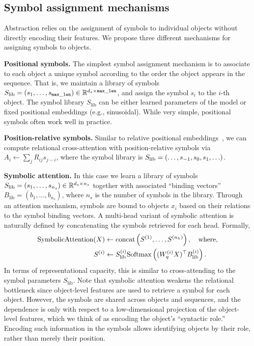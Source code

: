 \subsection{Symbol assignment mechanisms}\label{ssec:symbol_assignment}
Abstraction relies on the assignment of symbols to individual objects without directly encoding their features. We propose three different mechanisms for assigning symbols to objects. 

\textbf{Positional symbols.} The simplest symbol assignment mechanism is to  associate to each object a unique symbol according to the order the object appears in the sequence. That is, we maintain a library of symbols $S_{\mathrm{lib}} = (s_1, \ldots, s_{\mathtt{max\_len}}) \in \mathbb{R}^{d_s \times \mathtt{max\_len}}$, and assign the symbol $s_i$ to the $i$-th object. The symbol library $S_\mathrm{lib}$ can be either learned parameters of the model or fixed positional embeddings (e.g., sinusoidal). While very simple, positional symbols often work well in practice.

\textbf{Position-relative symbols.} Similar to relative positional embeddings~\citep{shaw2018self,kazemnejadImpactPositionalEncoding2023}, we can compute relational cross-attention with position-relative symbols via $A_i \gets \sum_j R_{ij} s_{j-i}$, where the symbol library is $S_{\mathrm{lib}} = \left(\ldots, s_{-1}, s_0, s_1, \ldots\right)$.

\textbf{Symbolic attention.} In this case we learn a library of symbols $S_{\mathrm{lib}} = (s_1, \ldots, s_{n_s}) \in \mathbb{R}^{d_s \times n_s}$ together with associated ``binding vectors'' $B_{\mathrm{lib}} = (b_1, \ldots, b_{n_s})$, where $n_s$ is the number of symbols in the library. Through an attention mechanism, symbols are bound to objects $x_i$ based on their relations to the symbol binding vectors. A multi-head variant of symbolic attention is naturally  defined by concatenating the symbols retrieved for each head. Formally, 
\begin{equation}
    \begin{split}
        \mathrm{SymbolicAttention}(X) &\gets \mathrm{concat}\left(S^{(1)}, \ldots, S^{(n_h)}\right), \quad \text{where,}\\
        S^{(i)} &\gets S_{\mathrm{lib}}^{(i)} \mathrm{Softmax} \left((W_q^{(i)} X)^\top B_{\mathrm{lib}}^{(i)}\right).
    \end{split}
\end{equation}
In terms of representational capacity, this is similar to cross-attending to the symbol parameters $S_{\mathrm{lib}}$.
Note that symbolic attention weakens the relational bottleneck since object-level features are used to retrieve a symbol for each object. However, 
the symbols are shared across objects and sequences, and the dependence is only with respect to a low-dimensional projection of the object-level features, which we think of as encoding the object's ``syntactic role.'' Encoding such information in the symbols allows identifying objects by their role, rather than merely their position.

